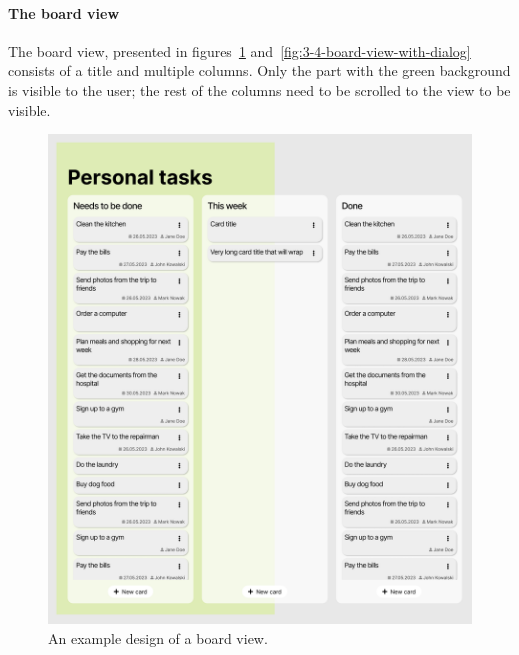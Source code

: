 \paragraph{The board view}
The board view, presented in figures~\ref{fig:3-4-board-view} and~\ref{fig:3-4-board-view-with-dialog} consists of a title and multiple columns.
Only the part with the green background is visible to the user;
the rest of the columns need to be scrolled to the view to be visible.

\begin{figure}
    \centering
    \includegraphics[height=0.4\textheight]{./3-research-methodology/board-view}
    \caption{An example design of a board view.}
    \label{fig:3-4-board-view}
\end{figure}


